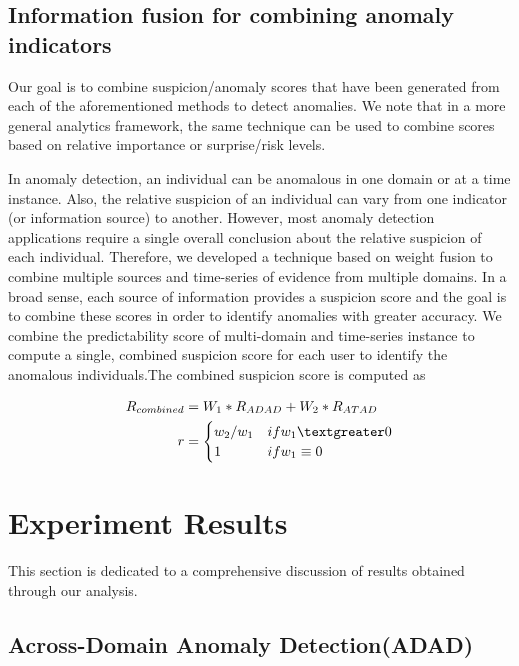 \documentclass[conference]{IEEEtran}
\begin{document}
\subsection{Information fusion for combining anomaly indicators}

Our goal is to combine suspicion/anomaly scores that have been generated from each of the aforementioned methods to detect anomalies. We note that in a more general analytics framework, the same technique can be used to combine scores based on relative importance or surprise/risk levels.

In anomaly detection, an individual can be anomalous in one domain or at a time instance. Also, the relative suspicion of an individual can vary from one indicator (or information source) to another. However, most anomaly detection applications require a single overall conclusion about the relative suspicion of each individual. Therefore, we developed a technique based on weight fusion to combine multiple sources and time-series of evidence from multiple domains. In a broad sense, each source of information provides a suspicion score and the goal is to combine these scores in order to identify anomalies with greater accuracy. We combine the predictability score of multi-domain and time-series instance to compute a single, combined suspicion score for each user to identify the anomalous individuals.The combined suspicion score is computed as

\begin{align}
R_{combined}&= W_1*R_{ADAD}+W_2*R_{ATAD}\\
r&=\begin{cases}
w_2/w_1
&\mbox{if } w_1 \textgreater 0\\
1
&\mbox{if } w_1 \equiv 0\\
\end{cases}
\end{align}


\section{Experiment Results}

This section is dedicated to a comprehensive discussion of results obtained through our analysis.

\subsection{Across-Domain Anomaly Detection(ADAD)}\label{AA}
\end{document}
